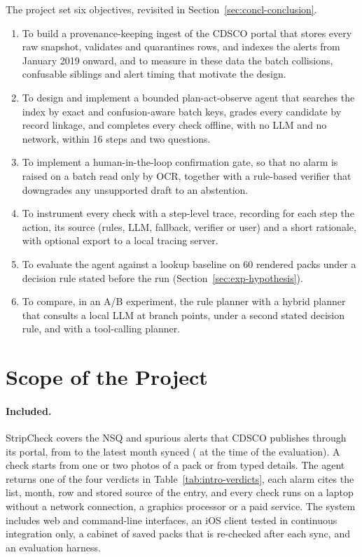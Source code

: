 The project set six objectives, revisited in Section~\ref{sec:concl-conclusion}.
\begin{enumerate}[itemsep=2pt]
\item To build a provenance-keeping ingest of the CDSCO portal that stores every raw snapshot,
validates and quarantines rows, and indexes the alerts from January 2019 onward, and to measure in
these data the batch collisions, confusable siblings and alert timing that motivate the design.
\item To design and implement a bounded plan-act-observe agent that searches the index by exact and
confusion-aware batch keys, grades every candidate by record linkage, and completes every check
offline, with no LLM and no network, within 16 steps and two questions.
\item To implement a human-in-the-loop confirmation gate, so that no alarm is raised on a batch read
only by OCR, together with a rule-based verifier that downgrades any unsupported draft to an
abstention.
\item To instrument every check with a step-level trace, recording for each step the action, its
source (rules, LLM, fallback, verifier or user) and a short rationale, with optional export to a
local tracing server.
\item To evaluate the agent against a lookup baseline on 60 rendered packs under a decision rule
stated before the run (Section~\ref{sec:exp-hypothesis}).
\item To compare, in an A/B experiment, the rule planner with a hybrid planner that consults a local
LLM at branch points, under a second stated decision rule, and with a tool-calling planner.
\end{enumerate}

\section{Scope of the Project}
\label{sec:intro-scope-of-the-project}

\paragraph{Included.} StripCheck covers the NSQ and spurious alerts that CDSCO publishes through
its portal, from \FirstMonth{} to the latest month synced (\LastMonth{} at the time of the
evaluation). A check starts from one or two photos of a pack or from typed details. The agent
returns one of the four verdicts in Table~\ref{tab:intro-verdicts}, each alarm cites the list,
month, row and stored source of the entry, and every check runs on a laptop without a network
connection, a graphics processor or a paid service. The system includes web and command-line
interfaces, an iOS client tested in continuous integration only, a cabinet of saved packs that is
re-checked after each sync, and an evaluation harness.

